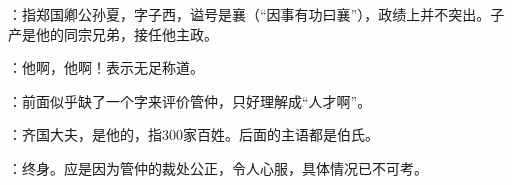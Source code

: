 {
\item {}：指郑国卿公孙夏，字子西，谥号是襄（“因事有功曰襄”），政绩上并不突出。子产是他的同宗兄弟，接任他主政。
\item {}：他啊，他啊！表示无足称道。
\item {}：前面似乎缺了一个字来评价管仲，只好理解成“人才啊”。
\item {}：齐国大夫，是他的，指300家百姓。后面的主语都是伯氏。%
\item {}：终身。应是因为管仲的裁处公正，令人心服，具体情况已不可考。
}
{}


{}
{}



